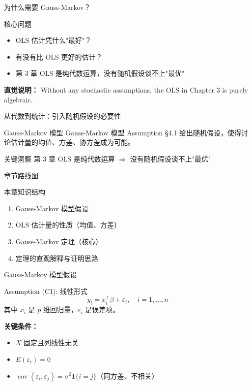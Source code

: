 \documentclass[]{beamer}
\DeclareMathOperator{\cov}{cov}
\begin{document}
\begin{frame}
\titlepage
\end{frame}

\begin{frame}{为什么需要 Gauss-Markov？}
\begin{block}{核心问题}
\begin{itemize}
  \item OLS 估计凭什么"最好"？
  \item 有没有比 OLS 更好的估计？
  \item 第 3 章 OLS 是纯代数运算，没有随机假设谈不上"最优"
\end{itemize}
\end{block}
\vspace{1em}
\textbf{直觉说明：} Without any stochastic assumptions, the OLS in Chapter 3 is purely algebraic.
\end{frame}

\begin{frame}{从代数到统计：引入随机假设的必要性}
\begin{block}{Gauss-Markov 模型}
Gauss-Markov 模型 Assumption \S 4.1 给出随机假设，使得讨论估计量的均值、方差、协方差成为可能。
\end{block}
\vspace{1em}
\begin{alertblock}{关键洞察}
第 3 章 OLS 是纯代数运算 $\Rightarrow$ 没有随机假设谈不上"最优"
\end{alertblock}
\end{frame}

\begin{frame}{章节路线图}
\begin{block}{本章知识结构}
\begin{enumerate}
  \item Gauss-Markov 模型假设
  \item OLS 估计量的性质（均值、方差）
  \item Gauss-Markov 定理（核心）
  \item 定理的直观解释与证明思路
\end{enumerate}
\end{block}
\end{frame}

\begin{frame}{Gauss-Markov 模型假设}
\begin{block}{Assumption (C1): 线性形式}
\[
y_i = x_i^\top \beta + \varepsilon_i, \quad i = 1, \ldots, n
\]
其中 $x_i$ 是 $p$ 维回归量，$\varepsilon_i$ 是误差项。
\end{block}
\vspace{0.5em}
\textbf{关键条件：}
\begin{itemize}
  \item $X$ 固定且列线性无关
  \item $E(\varepsilon_i) = 0$
  \item $\cov(\varepsilon_i, \varepsilon_j) = \sigma^2 \mathbf{1}\{i=j\}$（同方差、不相关）
\end{itemize}
\end{frame}
\end{document}
